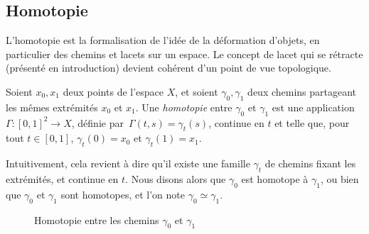 \subsection{Homotopie}\label{sec:homotopy}

L'homotopie est la formalisation de l'idée de la déformation d'objets, en particulier des chemins et lacets sur un espace. Le concept de lacet qui se rétracte (présenté en introduction) devient cohérent d'un point de vue topologique.

\begin{definition}\label{def:homotopy-paths}
Soient $x_0, x_1$ deux points de l'espace $X$, et soient $\gamma_0,\gamma_1$ deux chemins partageant les mêmes extrémités $x_0$ et $x_1$. Une \emph{homotopie} entre $\gamma_0$ et $\gamma_1$ est une application $\Gamma:[0,1]^2\to X$, définie par~$\Gamma(t,s)=\gamma_t(s)$, continue en $t$ et telle que, pour tout $t\in[0,1]$, $\gamma_t(0)=x_0$ et $\gamma_t(1)=x_1$.

Intuitivement, cela revient à dire qu'il existe une famille $\gamma_t$ de chemins fixant les extrémités, et continue en $t$. Nous disons alors que $\gamma_0$ est homotope à $\gamma_1$, ou bien que $\gamma_0$ et $\gamma_1$ sont homotopes, et l'on note $\gamma_0\simeq\gamma_1$.
\end{definition}

\begin{figure}[H]
    \centering
    \caption{Homotopie entre les chemins $\gamma_0$ et $\gamma_1$}
    \label{tkz:path-homotopy}
\end{figure}

